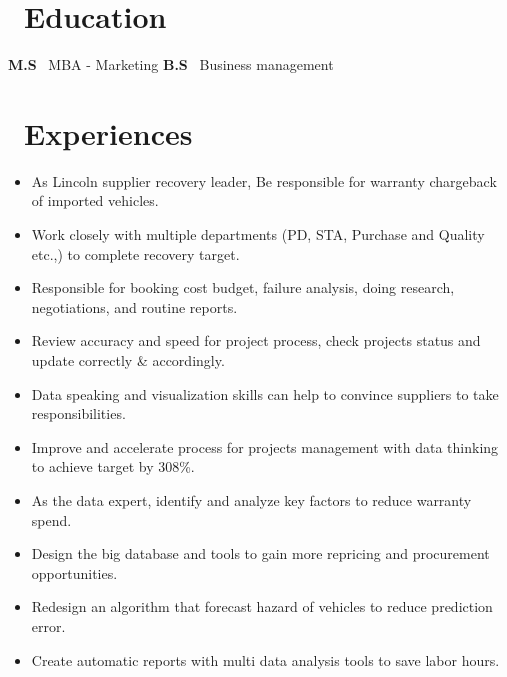 \documentclass{resume}
\begin{document}

\renewcommand{\familydefault}{\sfdefault}



 
\section{\faGraduationCap\  Education}
\textbf{M.S  }\ \quad MBA - Marketing
\textbf{B.S  }\ \quad Business management 

\linespread{1}
\section{\faCalendarCheckO\ Experiences}
\begin{itemize}
    \item As Lincoln supplier recovery leader, Be responsible for warranty chargeback of imported vehicles.
    \item Work closely with multiple departments (PD, STA, Purchase and Quality etc.,) to complete recovery target.
    \item Responsible for booking cost budget, failure analysis, doing research, negotiations, and routine reports.
    \item Review accuracy and speed for project process, check projects status and update correctly \& accordingly.
    \item Data speaking and visualization skills can help to convince suppliers to take responsibilities.
    \item Improve and accelerate process for projects management with data thinking to achieve target by 308\%.
\end{itemize}


\begin{itemize}
    \item As the data expert, identify and analyze key factors to reduce warranty spend.
    \item Design the big database and tools to gain more repricing and procurement opportunities.
    \item Redesign an algorithm that forecast hazard of vehicles to reduce prediction error.
    \item Create automatic reports with multi data analysis tools to save labor hours.
\end{itemize}
\end{document}
